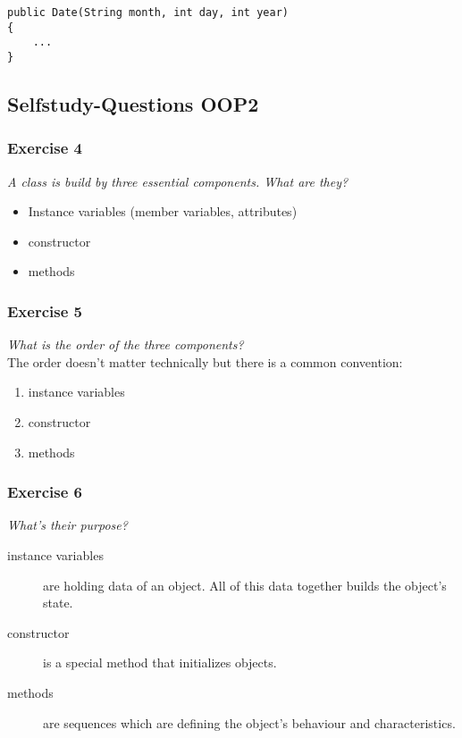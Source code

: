 \begin{lstlisting}
public Date(String month, int day, int year)
{
	...
}
\end{lstlisting}

\newpage
\subsection{Selfstudy-Questions OOP2}
\subsubsection*{Exercise 4}
\textit{A class is build by three essential components. What are they?}\\

\begin{itemize}
	\item Instance variables (member variables, attributes)
	\item constructor
	\item methods
\end{itemize}

\subsubsection*{Exercise 5}
\textit{What is the order of the three components?}\\

The order doesn't matter technically but there is a common convention:
\begin{enumerate}
	\item instance variables
	\item constructor
	\item methods
\end{enumerate}

\subsubsection*{Exercise 6}
\textit{What's their purpose?}\\

\begin{description}
	\item [instance variables] are holding data of an object. All of this
		data together builds the object's state.
	\item [constructor] is a special method that initializes objects.
	\item [methods] are sequences which are defining the object's 
		behaviour and characteristics.
\end{description}

